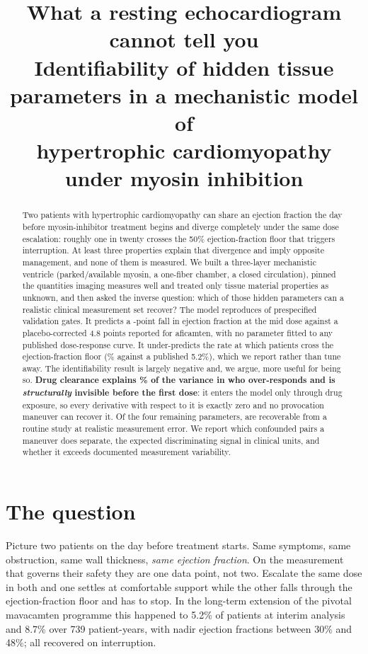 \documentclass[11pt,a4paper]{article}
\title{\vspace{-1.4cm}\textbf{What a resting echocardiogram cannot tell you}\\[2pt]
\large Identifiability of hidden tissue parameters in a mechanistic model of\\
hypertrophic cardiomyopathy under myosin inhibition}
\author{}
\date{}
\newcommand{\claim}[1]{\textcolor{accent}{\textbf{#1}}}
\begin{document}
\maketitle
\vspace{-1.6cm}

\begin{abstract}
\noindent
Two patients with hypertrophic cardiomyopathy can share an ejection fraction the day before
myosin-inhibitor treatment begins and diverge completely under the same dose escalation:
roughly one in twenty crosses the 50\% ejection-fraction floor that triggers interruption.
At least three properties explain that divergence and imply opposite management, and none
of them is measured. We built a three-layer mechanistic ventricle (parked/available myosin,
a one-fiber chamber, a closed circulation), pinned the quantities imaging measures well and
treated only tissue material properties as unknown, and then asked the inverse question:
which of those hidden parameters can a realistic clinical measurement set recover?
The model reproduces \nGatesPassed{} of \nGates{} prespecified validation gates. It predicts
a \efChangeMid{}-point fall in ejection fraction at the mid dose against a placebo-corrected
4.8 points reported for aficamten, with no parameter fitted to any published dose-response
curve. It under-predicts the rate at which patients cross the ejection-fraction floor
(\overResponderRate\% against a published 5.2\%), which we report rather than tune away.
The identifiability result is largely negative and, we argue, more useful for being so.
\claim{Drug clearance explains \outcomeTopSTpct\% of the variance in who over-responds and is
\emph{structurally} invisible before the first dose}: it enters the model only through drug
exposure, so every derivative with respect to it is exactly zero and no provocation maneuver
can recover it. Of the four remaining parameters, \nRecoverable{} are recoverable from a
routine study at realistic measurement error. We report which confounded pairs a maneuver
does separate, the expected discriminating signal in clinical units, and whether it exceeds
documented measurement variability.
\end{abstract}

\section{The question}

Picture two patients on the day before treatment starts. Same symptoms, same obstruction,
same wall thickness, \emph{same ejection fraction}. On the measurement that governs their
safety they are one data point, not two. Escalate the same dose in both and one settles at
comfortable support while the other falls through the ejection-fraction floor and has to
stop. In the long-term extension of the pivotal mavacamten programme this happened to 5.2\%
of patients at interim analysis and 8.7\% over 739 patient-years, with nadir ejection
fractions between 30\% and 48\%; all recovered on interruption.
\end{document}
